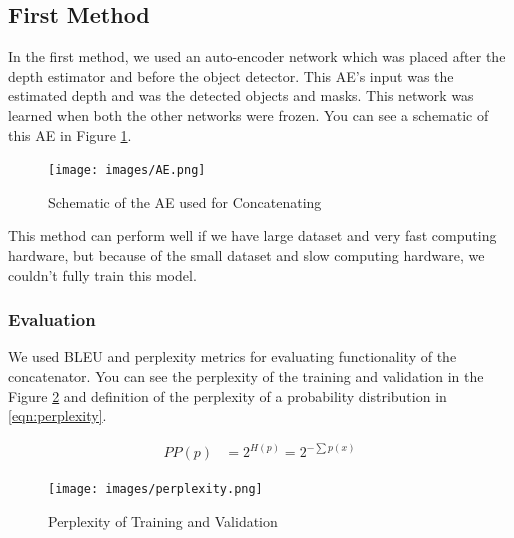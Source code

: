 \documentclass[a4paper, openany]{book}
\begin{document}
\subsection{First Method}
	\vspace{0.3cm}

In the first method, we used an auto-encoder network which was placed after the depth estimator and before the object detector. This AE's input was the estimated depth and was the detected objects and masks. This network was learned when both the other networks were frozen. You can see a schematic of this AE in Figure \ref{fig:AE}.


\begin{figure}[ht]
  \centering
    \texttt{[image: images/AE.png]}
      \caption{Schematic of the AE used for Concatenating}
  \label{fig:AE}
\end{figure}

This method can perform well if we have large dataset and very fast computing hardware, but because of the small dataset and slow computing hardware, we couldn't fully train this model.

\subsubsection{Evaluation}

We used BLEU and perplexity metrics for evaluating functionality of the concatenator. You can see the perplexity of the training and validation in the Figure \ref{fig:perplexity} and definition of the perplexity of a probability distribution in \ref{eqn:perplexity}.

\begin{eqnarray}
PP(p) &= 2^{H(p)} = 2^{-\sum p(x)} \label{eqn:perplexity}
\end{eqnarray}

\begin{figure}[ht]
  \centering
    \texttt{[image: images/perplexity.png]}
      \caption{Perplexity of Training and Validation}
  \label{fig:perplexity}
\end{figure}

\newpage
\end{document}

